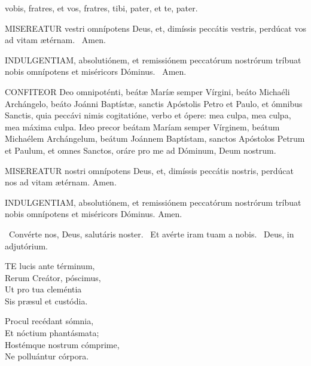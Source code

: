  vobis, fratres, et vos, fratres,  tibi, pater, et te, pater.


\lettrine[lines=2]{M}{ISEREATUR} vestri omnípotens Deus, et, dimíssis peccátis vestris, perdúcat vos ad vitam ætérnam. \R\ Amen.

\lettrine[lines=2]{I}{NDULGENTIAM}, absolutiónem, et remissiónem peccatórum nostrórum tríbuat nobis omnípotens et miséricors Dóminus. \R\ Amen.


\lettrine[lines=2]{C}{ONFITEOR} Deo omnipoténti, beátæ Maríæ semper Vírgini, beáto Michaéli Archángelo, beáto Joánni Baptístæ, sanctis Apóstolis Petro et Paulo, et ómnibus Sanctis, quia peccávi nimis cogitatióne, verbo et ópere: mea culpa, mea culpa, mea máxima culpa. Ideo precor beátam Maríam semper Vírginem, beátum Michaélem Archángelum, beátum Joánnem Baptístam, sanctos Apóstolos Petrum et Paulum, et omnes Sanctos, oráre pro me ad Dóminum, Deum nostrum.


\lettrine[lines=2]{M}{ISEREATUR} nostri omnípotens Deus, et, dimíssis peccátis nostris, perdúcat nos ad vitam ætérnam. Amen.

\lettrine[lines=2]{I}{NDULGENTIAM}, absolutiónem, et remissiónem peccatórum nostrórum tríbuat nobis omnípotens et miséricors Dóminus. Amen.


\V\ Convérte nos, Deus, salutáris noster. \R\ Et avérte iram tuam a nobis. \V\ Deus, in adjutórium.




\lettrine[lines=2]{T}{E} lucis ante términum,\\
Rerum Creátor, póscimus,\\
Ut pro tua cleméntia\\
Sis præsul et custódia.

Procul recédant sómnia,\\
Et nóctium phantásmata;\\
Hostémque nostrum cómprime,\\
Ne polluántur córpora.

